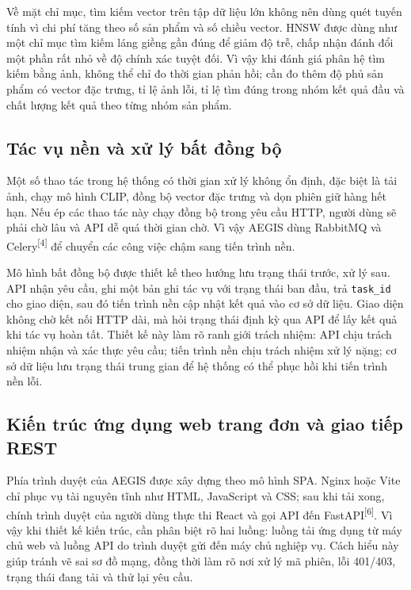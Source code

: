 \documentclass[12pt, a4paper]{article}
\begin{document}
Về mặt chỉ mục, tìm kiếm vector trên tập dữ liệu lớn không nên dùng quét tuyến tính vì chi phí tăng theo số sản phẩm và số chiều vector. HNSW được dùng như một chỉ mục tìm kiếm láng giềng gần đúng để giảm độ trễ, chấp nhận đánh đổi một phần rất nhỏ về độ chính xác tuyệt đối. Vì vậy khi đánh giá phân hệ tìm kiếm bằng ảnh, không thể chỉ đo thời gian phản hồi; cần đo thêm độ phủ sản phẩm có vector đặc trưng, tỉ lệ ảnh lỗi, tỉ lệ tìm đúng trong nhóm kết quả đầu và chất lượng kết quả theo từng nhóm sản phẩm.

\subsection{Tác vụ nền và xử lý bất đồng bộ}
\label{sec:tech_celery}
Một số thao tác trong hệ thống có thời gian xử lý không ổn định, đặc biệt là tải ảnh, chạy mô hình CLIP, đồng bộ vector đặc trưng và dọn phiên giữ hàng hết hạn. Nếu ép các thao tác này chạy đồng bộ trong yêu cầu HTTP, người dùng sẽ phải chờ lâu và API dễ quá thời gian chờ. Vì vậy AEGIS dùng RabbitMQ và Celery\textsuperscript{[4]} để chuyển các công việc chậm sang tiến trình nền.

Mô hình bất đồng bộ được thiết kế theo hướng lưu trạng thái trước, xử lý sau. API nhận yêu cầu, ghi một bản ghi tác vụ với trạng thái ban đầu, trả \texttt{task\_id} cho giao diện, sau đó tiến trình nền cập nhật kết quả vào cơ sở dữ liệu. Giao diện không chờ kết nối HTTP dài, mà hỏi trạng thái định kỳ qua API để lấy kết quả khi tác vụ hoàn tất. Thiết kế này làm rõ ranh giới trách nhiệm: API chịu trách nhiệm nhận và xác thực yêu cầu; tiến trình nền chịu trách nhiệm xử lý nặng; cơ sở dữ liệu lưu trạng thái trung gian để hệ thống có thể phục hồi khi tiến trình nền lỗi.

\subsection{Kiến trúc ứng dụng web trang đơn và giao tiếp REST}
Phía trình duyệt của AEGIS được xây dựng theo mô hình SPA. Nginx hoặc Vite chỉ phục vụ tài nguyên tĩnh như HTML, JavaScript và CSS; sau khi tải xong, chính trình duyệt của người dùng thực thi React và gọi API đến FastAPI\textsuperscript{[6]}. Vì vậy khi thiết kế kiến trúc, cần phân biệt rõ hai luồng: luồng tải ứng dụng từ máy chủ web và luồng API do trình duyệt gửi đến máy chủ nghiệp vụ. Cách hiểu này giúp tránh vẽ sai sơ đồ mạng, đồng thời làm rõ nơi xử lý mã phiên, lỗi 401/403, trạng thái đang tải và thử lại yêu cầu.
\end{document}
